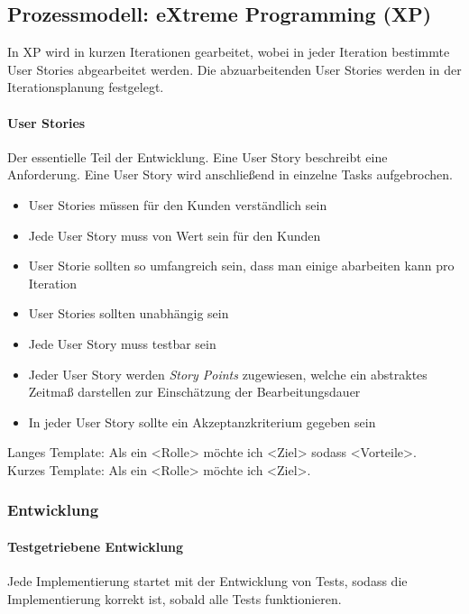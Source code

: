 \documentclass[
    ngerman,
    color=3b,
    summary,
    boxarc,
    main,
]{rubos-tuda-template}
\begin{document}
\subsection{Prozessmodell: eXtreme Programming (XP)}
In XP wird in kurzen Iterationen gearbeitet, wobei in jeder Iteration bestimmte User Stories abgearbeitet werden. Die abzuarbeitenden User Stories werden in der Iterationsplanung festgelegt.

\paragraph{User Stories}\mbox{}\par
\begin{definition}
    Der essentielle Teil der Entwicklung. Eine User Story beschreibt eine Anforderung. Eine User Story wird anschließend in einzelne Tasks aufgebrochen.
\end{definition}

\begin{itemize}
    \item User Stories müssen für den Kunden verständlich sein
    \item Jede User Story muss von Wert sein für den Kunden
    \item User Storie sollten so umfangreich sein, dass man einige abarbeiten kann pro Iteration
    \item User Stories sollten unabhängig sein
    \item Jede User Story muss testbar sein
    \item Jeder User Story werden \textit{Story Points} zugewiesen, welche ein abstraktes Zeitmaß darstellen zur Einschätzung der Bearbeitungsdauer
    \item In jeder User Story sollte ein Akzeptanzkriterium gegeben sein
\end{itemize}

\noindent Langes Template: Als ein <Rolle> möchte ich <Ziel> sodass <Vorteile>. \\
Kurzes Template: Als ein <Rolle> möchte ich <Ziel>.
\clearpage
\subsubsection{Entwicklung}
\paragraph{Testgetriebene Entwicklung}
Jede Implementierung startet mit der Entwicklung von Tests, sodass die Implementierung korrekt ist, sobald alle Tests funktionieren.
\end{document}
